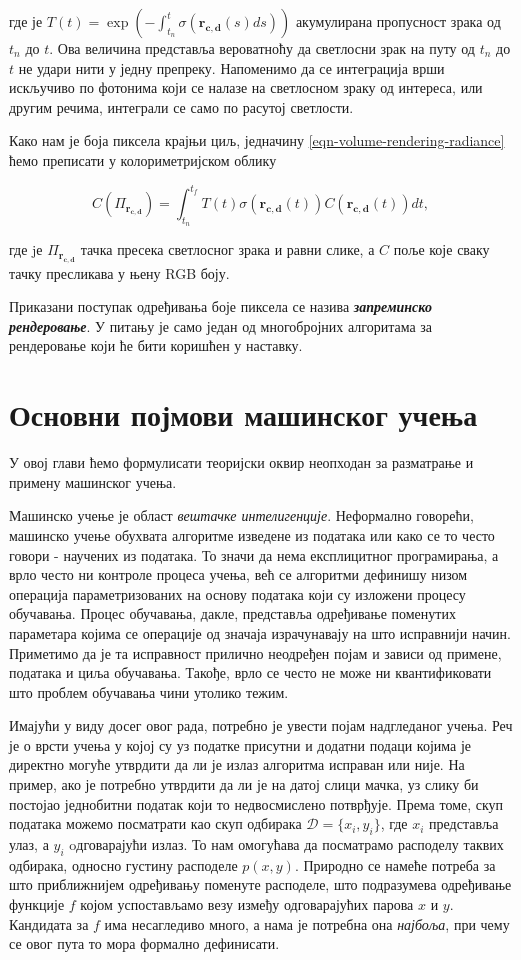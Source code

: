 \documentclass[12pt, a4paper, twoside]{book}
\numberwithin{equation}{chapter}
\numberwithin{theorem}{section}
\numberwithin{definition}{section}
\numberwithin{definitionChapter}{chapter}
\begin{document}
где је $T(t)=\exp{\left(-\int_{t_n}^{t}\sigma(\mathbf{r_{c, d}}(s)ds)\right)}$ акумулирана пропусност
зрака од $t_n$ до $t$. Ова величина представља вероватноћу да светлосни зрак на путу од $t_n$ до
$t$ не удари нити у једну препреку. Напоменимо да се интеграција врши искључиво по фотонима
који се налазе на светлосном зраку од интереса, или другим речима, интеграли се само по
расутој светлости.

Како нам је боја пиксела крајњи циљ, једначину \ref{eqn-volume-rendering-radiance} ћемо
преписати у колориметријском облику

\begin{equation}
	C(\Pi_{\mathbf{r_{c, d}}}) = \int_{t_n}^{t_f}T(t)\sigma(\mathbf{r_{c, d}}(t))C(\mathbf{r_{c, d}}(t))dt,
	\label{eqn-volume-rendering-colorimetry}
\end{equation}

где jе $\Pi_{\mathbf{r_{c, d}}}$ тачка пресека светлосног зрака и равни слике, а $C$ поље које сваку тачку
пресликава у њену RGB боју.

Приказани поступак одређивања боје пиксела се назива \textbf{\textit{запреминско рендеровање}}.
У питању је само један од многобројних алгоритама за рендеровање који ће бити коришћен у наставку.

\chapter{Основни појмови машинског учења}
У овој глави ћемо формулисати теоријски оквир неопходан за разматрање и примену машинског учења.

Машинско учење је област \textit{вештачке интелигенције}. Неформално говорећи, машинско учење
обухвата алгоритме изведене из података или како се то често говори - научених из података.
То значи да нема експлицитног програмирања, а врло често ни контроле процеса учења, већ се
алгоритми дефинишу низом операција параметризованих на основу података који су изложени
процесу обучавања. Процес обучавања, дакле, представља одређивање поменутих параметара
којима се операције од значаја израчунавају на што исправнији начин. Приметимо да је та
исправност прилично неодређен појам и зависи од примене, података и циља обучавања. Такође,
врло се често не може ни квантификовати што проблем обучавања чини утолико тежим.

Имајући у виду досег овог рада, потребно је увести појам надгледаног учења. Реч је о врсти
учења у којој су уз податке присутни и додатни подаци којима је директно могуће утврдити
да ли је излаз алгоритма исправан или није. На пример, ако је потребно утврдити да ли је на
датој слици мачка, уз слику би постојао једнобитни податак који то недвосмислено потврђује.
Према томе, скуп података можемо посматрати као скуп одбирака $\mathcal{D}=\{x_i, y_i\}$,
где $x_i$ представља улаз, а $y_i$ oдговарајући излаз. То нам омогућава да посматрамо
расподелу таквих одбирака, односно густину расподеле $p(x, y)$. Природно се намеће потреба
за што приближнијем одређивању поменуте расподеле, што подразумева одређивање функције $f$
којом успостављамо везу између одговарајућих парова $x$ и $y$. Кандидата за $f$ има
несагледиво много, а нама је потребна она \textit{најбоља}, при чему се овог пута то мора
формално дефинисати.
\end{document}
